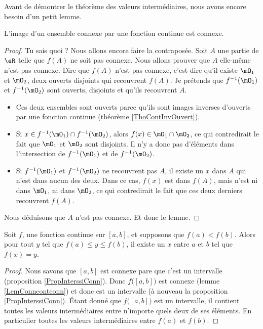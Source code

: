 

Avant de démontrer le théorème des valeurs intermédiaires, nous avons encore besoin d'un petit lemme.
\begin{lemma}	\label{LemConncontconn}
L'image d'un ensemble connexe par une fonction continue est connexe.
\end{lemma}

\begin{proof}
Tu sais quoi ? Nous allons encore faire la contraposée. Soit $A$ une partie de $\eR$ telle que $f(A)$ ne soit pas connexe. Nous allons prouver que $A$ elle-même n'est pas connexe. Dire que $f(A)$ n'est pas connexe, c'est dire qu'il existe $\mO_1$ et $\mO_2$, deux ouverts disjoints qui recouvrent $f(A)$. Je prétends que $f^{-1}(\mO_1)$ et $f^{-1}(\mO_2)$ sont ouverts, disjoints et qu'ils recouvrent $A$.
\begin{itemize}
\item Ces deux ensembles sont ouverts parce qu'ils sont images inverses d'ouverts par une fonction continue (théorème \ref{ThoContInvOuvert}).
\item Si $x\in f^{-1}(\mO_1)\cap f^{-1}(\mO_2)$, alors $f(x)\in \mO_1\cap\mO_2$, ce qui contredirait le fait que $\mO_1$ et $\mO_2$ sont disjoints. Il n'y a donc pas d'éléments dans l'intersection de $f^{-1}(\mO_1)$ et de $f^{-1}(\mO_2)$.
\item Si $f^{-1}(\mO_1)$ et $f^{-1}(\mO_2)$ ne recouvrent pas $A$, il existe un $x$ dans $A$ qui n'est dans aucun des deux. Dans ce cas, $f(x)$ est dans $f(A)$, mais n'est ni dans $\mO_1$, ni dans $\mO_2$, ce qui contredirait le fait que ces deux derniers recouvrent $f(A)$.
\end{itemize}
Nous déduisons que $A$ n'est pas connexe. Et donc le lemme.
\end{proof}

\begin{theorem}		\label{ThoValInter}
Soit $f$, une fonction continue sur $[a,b]$, et supposons que $f(a)<f(b)$. Alors pour tout $y$ tel que $f(a)\leq y\leq f(b)$, il existe un $x$ entre $a$ et $b$ tel que $f(x)=y$.
\end{theorem}

\begin{proof}
Nous savons que $[a,b]$ est connexe pare que c'est un intervalle (proposition \ref{PropInterssiConn}). Donc $f\big( [a,b] \big)$ est connexe (lemme \ref{LemConncontconn}) et donc est un intervalle (à nouveau la proposition \ref{PropInterssiConn}). Étant donné que $f\big( [a,b] \big)$ est un intervalle, il contient toutes les valeurs intermédiaires entre n'importe quels deux de ses éléments. En particulier toutes les valeurs intermédiaires entre $f(a)$ et $f(b)$.
\end{proof}

